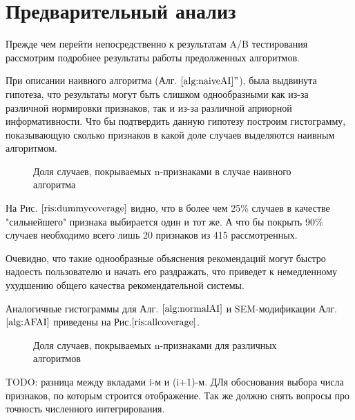 \documentclass[12pt,a4paper]{report}
\begin{document}
\section{Предварительный анализ}
Прежде чем перейти непосредственно к результатам A/B  тестирования рассмотрим подробнее результаты работы предолженных алгоритмов.

При описании наивного алгоритма (Алг. $\ref{alg:naiveAI}"$), была выдвинута гипотеза, что результаты могут быть слишком однообразными как из-за различной нормировки признаков, так и из-за различной априорной информативности. Что бы подтвердить данную гипотезу построим гистограмму, показывающую сколько признаков в какой доле случаев выделяются наивным алгоритмом.

\begin{figure}[H]
\caption{Доля случаев, покрываемых n-признаками в случае наивного алгоритма}
\label{ris:dummycoverage}
\end{figure}

На Рис. $\ref{ris:dummycoverage}$ видно, что в более чем 25\% случаев в качестве "сильнейшего" признака выбирается один и тот же. А что бы покрыть 90\% случаев необходимо всего лишь 20 признаков из 415 рассмотренных.

Очевидно, что такие однообразные объяснения рекомендаций могут быстро надоесть пользователю и начать его раздражать, что приведет к немедленному ухудшению общего качества рекомендательной системы.

Аналогичные гистограммы для Алг. $\ref{alg:normalAI}$ и SEM-модификации Алг. $\ref{alg:AFAI}$ приведены на Рис.$\ref{ris:allcoverage}$.

\begin{figure}[H]
\begin{minipage}[h]{0.49\linewidth}
\end{minipage}
\hfill
\begin{minipage}[h]{0.49\linewidth}
\end{minipage}
\caption{Доля случаев, покрываемых n-признаками для различных алгоритмов}
\label{ris:allcoverage}
\end{figure}

 TODO:  разница между вкладами i-м и (i+1)-м. ДЛя обоснования выбора числа признаков, по которым строится отображение. Так же должно снять вопросы про точность численного интегрирования.
\end{document}
